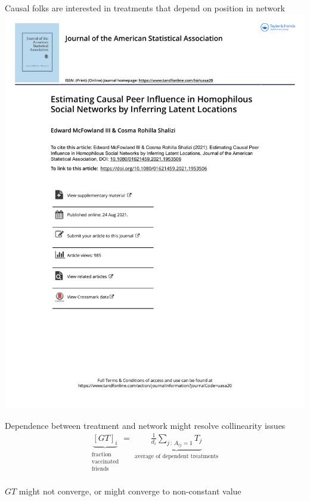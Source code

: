 \documentclass[aspectratio=169]{beamer}
\theoremstyle{remark}
\begin{document}
\begin{frame}{Causal folks are interested in treatments that depend on position in network}
    \centering
    \includegraphics[width=\textwidth, page=2, trim={1.5cm 16cm 0 3.3cm}, clip]{./papers/shalizi.pdf}
\end{frame}

\begin{frame}{Dependence between treatment and network might resolve collinearity issues}
    \Large
    \begin{align*}
        \underbrace{[GT]_i}_{\substack{\text{fraction} \\ \text{vaccinated} \\ \text{friends}}}
        = \underbrace{
            \frac{1}{d_i} \sum_{j \, : \, A_{ij} = 1} T_j
        }_{\substack{\text{average of dependent treatments}}}
    \end{align*} \\
    \normalsize
    \centering
    \vspace{8mm}
    $GT$ might not converge, or might converge to non-constant value
\end{frame}
\end{document}
